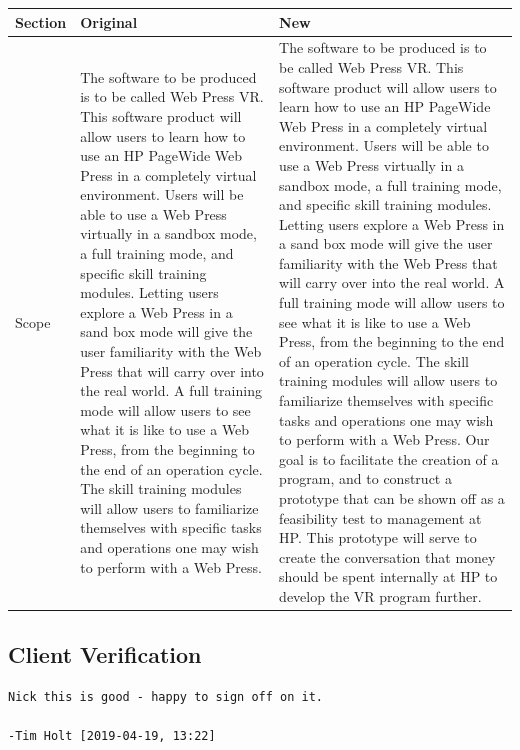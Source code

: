 \documentclass[onecolumn, draftclsnofoot,10pt, compsoc]{IEEEtran}
\begin{document}
\begin{table}[ht!]
\begin{tabularx}{\textwidth}{|l|X|X|}
\hline
\rowcolor[HTML]{C0C0C0} 
Section & Original & New \\ \hline
Scope &     The software to be produced is to be called Web Press VR. This software product will allow users to learn how to use
an HP PageWide Web Press in a completely virtual environment. Users will be able to use a Web Press virtually in a
sandbox mode, a full training mode, and specific skill training modules. Letting users explore a Web Press in a sand
box mode will give the user familiarity with the Web Press that will carry over into the real world. A full training mode
will allow users to see what it is like to use a Web Press, from the beginning to the end of an operation cycle. The skill
training modules will allow users to familiarize themselves with specific tasks and operations one may wish to perform
with a Web Press.     &   The software to be produced is to be called Web Press VR. This software product will allow users to learn how to use
an HP PageWide Web Press in a completely virtual environment. Users will be able to use a Web Press virtually in a
sandbox mode, a full training mode, and specific skill training modules. Letting users explore a Web Press in a sand
box mode will give the user familiarity with the Web Press that will carry over into the real world. A full training mode
will allow users to see what it is like to use a Web Press, from the beginning to the end of an operation cycle. The skill
training modules will allow users to familiarize themselves with specific tasks and operations one may wish to perform
with a Web Press. Our goal is to facilitate the creation of a program, and to construct a prototype that can be shown off as a feasibility test to management at HP. This prototype will serve to create the conversation that money should be spent internally at HP to develop the VR program further.  \\ \hline
\end{tabularx}
\end{table}

\subsection*{Client Verification}

\begin{Verbatim}[frame=single]
Nick this is good - happy to sign off on it.

-Tim Holt [2019-04-19, 13:22]
\end{Verbatim}
\end{document}
